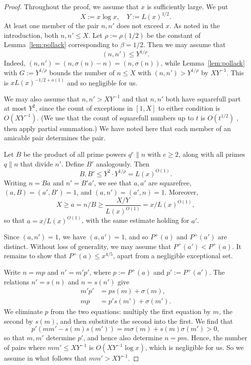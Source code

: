 \documentclass[11pt]{amsart}
\begin{document}
    \begin{proof}
    Throughout the proof, we assume that $x$ is sufficiently large. We put
    \[
     X:=x\log x,\quad Y:=L(x)^{1/2}.
    \]
    At least one member of the pair $n, n'$ does not exceed $x$. As noted in the introduction, both $n,n'\le X$. Let $\rho:=\rho(1/2)$ be the constant of Lemma~\ref{lem:pollack} corresponding to $\beta=1/2$. Then we may assume that
    \[
     (n,n')\le Y^{1/\rho}.
    \]
    Indeed, $(n,n')=(n,\sigma(n)-n)=(n,\sigma(n))$, while Lemma~\ref{lem:pollack} with $G:=Y^{1/\rho}$ bounds the number of $n\le X$ with $(n,n')>Y^{1/\rho}$ by $XY^{-1}$. This is $xL(x)^{-1/2+o(1)}$ and so negligible for us.
    
    We may also assume that $n,n'>XY^{-1}$ and that $n,n'$ both have squarefull part at most $Y^2$, since the count of exceptions in $[1,X]$ to either condition is $O(XY^{-1})$. (We use that the count of squarefull numbers up to $t$ is $O(t^{1/2})$ \cite[p.~101, (14)]{ErdosSzekeres1934}, then apply partial summation.) We have noted here that each member of an amicable pair determines the pair.
    
    Let $B$ be the product of all prime powers $q^e\parallel n$ with $e\ge 2$, along with all primes $q\parallel n$ that divide $n'$. Define $B'$ analogously. Then
    \[
     B,B'\le Y^2\cdot Y^{1/\rho}=L(x)^{O(1)}.
    \]
    Writing $n=Ba$ and $n'=B'a'$, we see that $a,a'$ are squarefree, $(a,B)=(a',B')=1$, and $(a,n')=(a',n)=1$. Moreover,
    \[
     X\ge a=n/B\ge\frac{X/Y}{L(x)^{O(1)}}=x/L(x)^{O(1)},
    \]
    so that $a=x/L(x)^{O(1)}$, with the same estimate holding for $a'$.
    
    Since $(a,n')=1$, we have $(a,a')=1$, and so $P^{+}(a)$ and $P^{+}(a')$ are distinct. Without loss of generality, we may assume that $P^{+}(a')<P^{+}(a)$. It remains to show that $P^{+}(a)\le x^{4/5}$, apart from a negligible exceptional set.
    
    Write $n=mp$ and $n'=m'p'$, where $p:=P^{+}(a)$ and $p':=P^{+}(a')$. The relations $n'=s(n)$ and $n=s(n')$ give 
    \begin{align*}
     m'p'&=ps(m)+\sigma(m),\\
     mp&=p's(m')+\sigma(m').
    \end{align*}
    We eliminate $p$ from the two equations: multiply the first equation by $m$, the second by $s(m)$, and then substitute the second into the first. We find that
    \[
     p'(mm'-s(m)s(m'))=m\sigma(m)+s(m)\sigma(m')>0,
    \]
    so that $m,m'$ determine $p'$, and hence also determine $n=pm$. Hence, the number of pairs where $mm'\le XY^{-1}$ is $O(XY^{-1}\log x)$, which is negligible for us. So we assume in what follows that $mm'>XY^{-1}$.
    

\end{proof}
\end{document}
